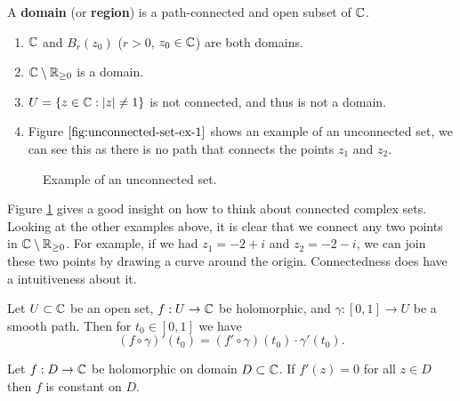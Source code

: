 
\begin{definition}[Domain]
    A \textbf{domain} (or \textbf{region}) is a path-connected and open subset of $\mathbb{C}$.
\end{definition}

\begin{example}
    \begin{enumerate}
        \item $\mathbb{C}$ and $B_r(z_0)$ ($r > 0$, $z_0 \in \mathbb{C}$) are both domains.
        \item $\mathbb{C} \setminus \mathbb{R}_{\geq 0}$ is a domain.
        \item $U = \{ z \in \mathbb{C} : \lvert z \rvert \neq 1 \}$ is not connected, and thus is not a domain.
        \item Figure $\ref{fig:unconnected-set-ex-1}$ shows an example of an unconnected set, we can see this as there is no path that connects the points $z_1$ and $z_2$.
    \end{enumerate}
\end{example}

\begin{figure}
    \centering
    \caption{Example of an unconnected set.}
    \label{fig:unconnected-set-ex-1}
\end{figure}

\begin{remark}
    Figure \ref{fig:unconnected-set-ex-1} gives a good insight on how to think about connected complex sets. Looking at the other examples above, it is clear that we connect any two points in $\mathbb{C} \setminus \mathbb{R}_{\geq 0}$. For example, if we had $z_1 = -2 + i$ and $z_2 = -2 - i$, we can join these two points by drawing a curve around the origin. Connectedness does have a intuitiveness about it.
\end{remark}

\begin{lemma}
    \label{lem:chain_rule}
    Let $U \subset \mathbb{C}$ be an open set, $f: U \to \mathbb{C}$ be holomorphic, and $\gamma: [0, 1] \to U$ be a smooth path. Then for $t_0 \in [0, 1]$ we have 
    \[ (f \circ \gamma)'(t_0) = (f' \circ \gamma)(t_0) \cdot \gamma'(t_0). \]
\end{lemma}

\begin{theorem}[]
    Let $f: D \to \mathbb{C}$ be holomorphic on domain $D \subset \mathbb{C}$. If $f'(z) = 0$ for all $z \in D$ then $f$ is constant on $D$.
\end{theorem}

